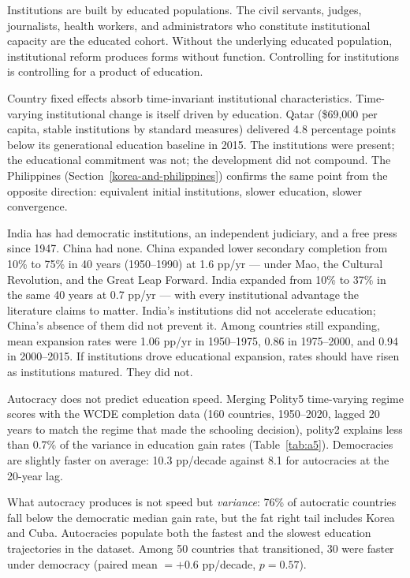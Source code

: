\documentclass[12pt,letterpaper]{article}
\begin{document}
{Institutions are built by educated populations. The civil servants, judges, journalists, health workers, and administrators who constitute institutional capacity are the educated cohort. Without the underlying educated population, institutional reform produces forms without function. Controlling for institutions is controlling for a product of education.

Country fixed effects absorb time-invariant institutional characteristics. Time-varying institutional change is itself driven by education. Qatar (\$69,000 per capita, stable institutions by standard measures) delivered 4.8 percentage points below its generational education baseline in 2015. The institutions were present; the educational commitment was not; the development did not compound. The Philippines (Section~\ref{korea-and-philippines}) confirms the same point from the opposite direction: equivalent initial institutions, slower education, slower convergence.

India has had democratic institutions, an independent judiciary, and a free press since 1947. China had none. China expanded lower secondary completion from 10\% to 75\% in 40 years (1950--1990) at 1.6 pp/yr --- under Mao, the Cultural Revolution, and the Great Leap Forward. India expanded from 10\% to 37\% in the same 40 years at 0.7 pp/yr --- with every institutional advantage the literature claims to matter. India's institutions did not accelerate education; China's absence of them did not prevent it. Among countries still expanding, mean expansion rates were 1.06 pp/yr in 1950--1975, 0.86 in 1975--2000, and 0.94 in 2000--2015. If institutions drove educational expansion, rates should have risen as institutions matured. They did not.

Autocracy does not predict education speed. Merging Polity5 time-varying regime scores with the WCDE completion data (160 countries, 1950--2020, lagged 20 years to match the regime that made the schooling decision), polity2 explains less than 0.7\% of the variance in education gain rates (Table~\ref{tab:a5}). Democracies are slightly faster on average: 10.3 pp/decade against 8.1 for autocracies at the 20-year lag.

What autocracy produces is not speed but \emph{variance}: 76\% of autocratic countries fall below the democratic median gain rate, but the fat right tail includes Korea and Cuba. Autocracies populate both the fastest and the slowest education trajectories in the dataset. Among 50 countries that transitioned, 30 were faster under democracy (paired mean $= +0.6$ pp/decade, $p = 0.57$).

}
\end{document}
